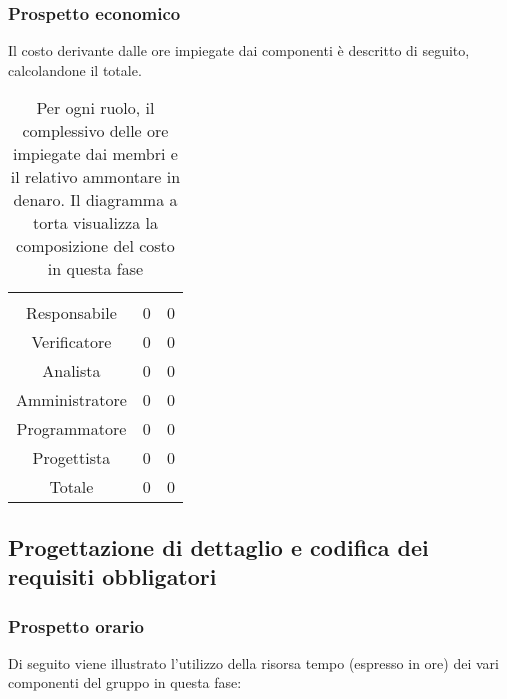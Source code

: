 \subsubsection{Prospetto economico}
Il costo derivante dalle ore impiegate dai componenti è descritto di seguito, calcolandone il totale.

\begin{table}[H]
{\setlength{\parindent}{0cm}
\begin{minipage}{.43\textwidth}
	\begin{tabular}{ccc}
	\rowcolorhead
	\headertitle{Ruolo} & \headertitle{Ore} & \headertitle{Costo(€)}\\
	Responsabile & 0 & 0\\
	Verificatore & 0 & 0\\
	Analista & 0 & 0\\
	Amministratore & 0 & 0\\
	Programmatore & 0 & 0\\
	Progettista & 0 & 0\\
	\hline
	Totale & 0& 0\\
	\end{tabular}
\end{minipage}%
\begin{minipage}{.57\textwidth}
\end{minipage} }
\caption{Per ogni ruolo, il complessivo delle ore impiegate dai membri e il relativo ammontare in denaro. Il diagramma a torta visualizza la composizione del costo in questa fase}
\end{table}


\subsection{Progettazione di dettaglio e codifica dei requisiti obbligatori}
\subsubsection{Prospetto orario}
Di seguito viene illustrato l'utilizzo della risorsa tempo (espresso in ore) dei vari componenti del gruppo in questa fase:

